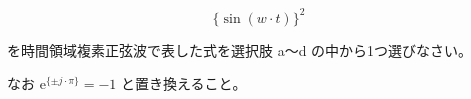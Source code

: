 \[
\{\sin (w\cdot t) \}^2
\]

\bigskip
\noindent を時間領域複素正弦波で表した式を選択肢 a〜d の中から1つ選びなさい。

\noindent なお $\textrm{e}^{\{ \pm j \cdot \pi \}} = -1$ と置き換えること。
